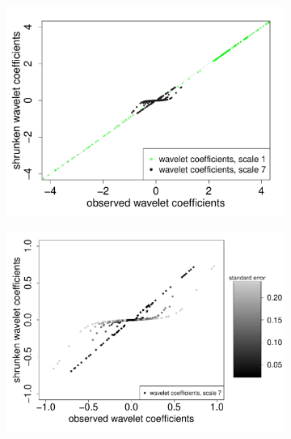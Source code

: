\documentclass[12pt]{article}
\begin{document}
\begin{figure}
\begin{subfigure}[b]{0.48\textwidth}
        \includegraphics[width=\textwidth]{simple_eg_3.pdf}
        \caption{}
        \label{fig:simple_eg_3}
    \end{subfigure}
		\hfill
    \begin{subfigure}[b]{0.48\textwidth}
        \centering
        \includegraphics[width=\textwidth]{simple_eg_4.pdf}
        \caption{}
        \label{fig:simple_eg_4}
    \end{subfigure}
				\hfill
    \begin{subfigure}[b]{0.48\textwidth}
        \centering

\end{subfigure}
\end{figure}
\end{document}

